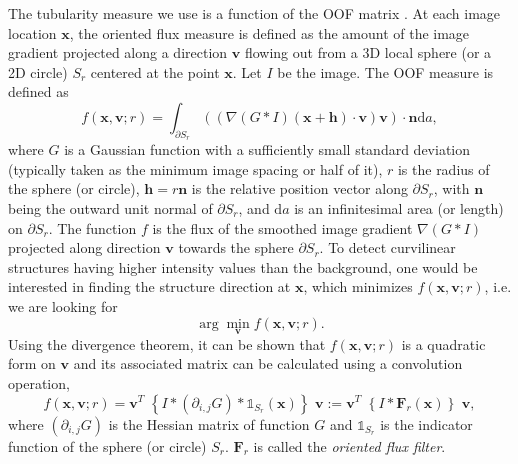 \documentclass{InsightArticle}
\begin{document}
The tubularity measure we use is a function of the OOF matrix \cite{Law08}.
At each image location $\mathbf{x}$, the oriented flux measure is defined as the amount of the image gradient projected 
along a direction $\mathbf{v}$ flowing out from a 3D local sphere (or a 2D circle) $S_r$ centered at the point $\mathbf{x}$. Let $I$ be the image. The OOF measure is defined as
\begin{equation}
f(\mathbf{x}, \mathbf{v};r)
=\int_{\partial S_r} \left((\nabla (G*I)(\mathbf{x} + \mathbf{h})\cdot \mathbf{v})\mathbf{v}\right)
\cdot \mathbf{n} \mathrm{d}a,
\label{eqn:oflux}
\end{equation}
where $G$ is a Gaussian function with a sufficiently small standard deviation (typically taken as the minimum image spacing or half of it), $r$ is the radius of the sphere (or circle), $\mathbf{h} = r \mathbf{n}$ is the relative position vector along $\partial S_r$, with $\mathbf{n}$ being the outward unit normal of $\partial S_r$, and $\mathrm{d}a$ is an infinitesimal area (or length) on $\partial S_r$. The function $f$ is the flux of the smoothed image gradient $\nabla(G*I)$ projected along direction $\mathbf{v}$ towards the sphere $\partial S_r$. To detect curvilinear structures having higher intensity values than the background, one would be interested in finding the structure direction at $\mathbf{x}$, which minimizes $f(\mathbf{x}, \mathbf{v}; r)$, i.e. we are looking for
\begin{equation}
\arg\min\limits_{\mathbf{v}} f(\mathbf{x}, \mathbf{v};r).
\label{eqn:min}
\end{equation}
Using the divergence theorem, it can be shown that $f(\mathbf{x}, \mathbf{v};r)$ is a quadratic form on $\mathbf{v}$ and its associated matrix can be calculated using a convolution operation,
\begin{equation}\label{eqn:ofluxmatrix}
f(\mathbf{x}, \mathbf{v};r)= \mathbf{v}^{T}\,\,\left\{ I*(\partial_{i,j} G)*\mathds{1}_{S_r} (\mathbf{x})\right\}\,\, \mathbf{v} := \mathbf{v}^{T}\,\,\left\{ I*\mathbf{F}_r (\mathbf{x})\right\}\,\, \mathbf{v},
\end{equation}
where $(\partial_{i,j} G)$ is the Hessian matrix of function $G$ and $\mathds{1}_{S_r}$ is the indicator function of the sphere (or circle) $S_r$. $\mathbf{F}_r$ is called the \textit{oriented flux filter}. 
\end{document}
